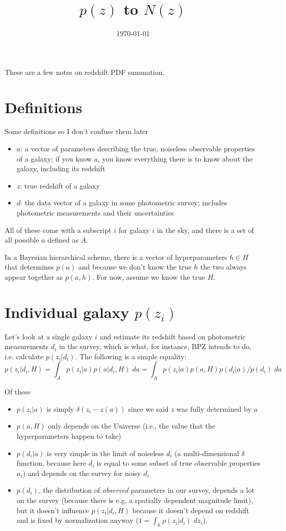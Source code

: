 \documentclass[11pt]{amsart}
\title{$p(z)$ to $N(z)$}
\date{\today}                                           %
\begin{document}
\maketitle

These are a few notes on redshift PDF summation.

\section{Definitions}

Some definitions so I don't confuse them later
\begin{itemize}
\item $a$: a vector of parameters describing the true, noiseless observable properties of a galaxy; if you know $a$, you know everything there is to know about the galaxy, including its redshift
\item $z$: true redshift of a galaxy 
\item $d$: the data vector of a galaxy in some photometric survey; includes photometric measurements and their uncertainties
\end{itemize}
All of these come with a subscript $i$ for galaxy $i$ in the sky, and there is a set of all possible $a$ defined as $A$. 

In a Bayesian hierarchical scheme, there is a vector of hyperparameters $h\in H$ that determines $p(a)$ and because we don't know the true $h$ the two always appear together as $p(a,h)$. For now, assume we know the true $H$.
\section{Individual galaxy $p(z_i)$}

Let's look at a single galaxy $i$ and estimate its redshift based on photometric measurements $d_i$ in the survey, which is what, for instance, BPZ intends to do, i.e. calculate $p(z_i|d_i)$. The following is a simple equality:
\begin{equation}
p(z_i|d_i, H)=\int_{A} p(z_i|a) p(a|d_i, H) \; da = \int_{A} p(z_i|a) p(a, H) p(d_i|a) / p(d_i) \; da
\end{equation}

Of these
\begin{itemize}
\item $p(z_i|a)$ is simply $\delta(z_i-z(a))$ since we said $z$ was fully determined by $a$ 
\item $p(a, H)$ only depends on the Universe (i.e., the value that the hyperparameters happen to take)
\item $p(d_i|a)$ is very simple in the limit of noiseless $d_i$ (a multi-dimensional $\delta$ function, because here $d_i$ is equal to some subset of true observable properties $a_i$) and depends on the survey for noisy $d_i$
\item $p(d_i)$, the distribution of \emph{observed} parameters in our survey, depends a lot on the survey (because there is e.g. a spatially dependent magnitude limit), but it doesn't influence $p(z_i|d_i, H)$ because it doesn't depend on redshift and is fixed by normalization anyway ($1=\int_{\mathbb{R}} p(z_i|d_i)\; dz_i$).
\end{itemize}
\end{document}
